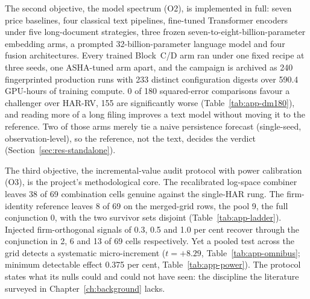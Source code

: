The second objective, the model spectrum (O2), is implemented in full: seven price baselines, four classical text pipelines, fine-tuned Transformer encoders under five long-document strategies, three frozen seven-to-eight-billion-parameter embedding arms, a prompted 32-billion-parameter language model and four fusion architectures. %
Every trained Block~C/D arm ran under one fixed recipe at three seeds, one ASHA-tuned arm apart, and the campaign is archived as 240 fingerprinted production runs with 233 distinct configuration digests %
over 590.4 GPU-hours of training compute. %
0 of 180 squared-error comparisons favour a challenger over HAR-RV, 155 are significantly worse (Table~\ref{tab:app-dm180}), %
and reading more of a long filing improves a text model without moving it to the reference. Two of those arms merely tie a naive persistence forecast (single-seed, observation-level), so the reference, not the text, decides the verdict (Section~\ref{sec:res-standalone}). %

The third objective, the incremental-value audit protocol with power calibration (O3), is the project's methodological core. The recalibrated log-space combiner leaves 38 of 69 combination cells genuine against the single-HAR rung. %
The firm-identity reference leaves 8 of 69 on the merged-grid rows, the pool 9, the full conjunction 0, with the two survivor sets disjoint (Table~\ref{tab:app-ladder}). %
Injected firm-orthogonal signals of 0.3, 0.5 and 1.0 per cent recover through the conjunction in 2, 6 and 13 of 69 cells respectively. %
Yet a pooled test across the grid detects a systematic micro-increment ($t=+8.29$, Table~\ref{tab:app-omnibus}; minimum detectable effect 0.375 per cent, Table~\ref{tab:app-power}). %
The protocol states what its nulls could and could not have seen: the discipline the literature surveyed in Chapter~\ref{ch:background} lacks.

